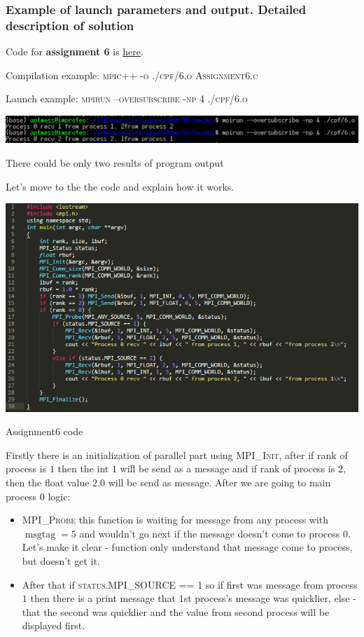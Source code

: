 \documentclass[%
12pt, %
final, %
oneside, %
onecolumn, %
centertags]{article} %
\theoremstyle{plain}
\theoremstyle{definition}
\theoremstyle{remark}
\begin{document}
\subsubsection{Example of launch parameters and output. Detailed description of solution}

Code for \textbf{assignment 6} is \href{https:\//github.com/aptmess/parallel_algorithms/blob/master/HT/hw_mpi/Assignment6.c}{here}.

Compilation example: \textsc{mpic++ -o ./cpf/6.o Assignment6.c}

Launch example: \textsc{mpirun --oversubscribe -np 4 ./cpf/6.o}

\begin{center}
\includegraphics[scale=0.7]{6.1.png}

There could be only two results of program output
\end{center}

Let's move to the the code and explain how it works.

\begin{center}
\includegraphics[scale=0.95]{6.code.png}

Assignment6 code
\end{center}

Firstly there is an initialization of parallel part using \textsc{MPI\_Init}, after if rank of process is $1$ then the int $1$ will be send as a message and if rank of process is $2$, then the float value $2.0$ will be send as message. After we are going to main process $0$ logic: 

\begin{itemize}
	\item \textsc{MPI\_Probe} this function is waiting for message from any process with $\operatorname{msgtag}=5$ and wouldn't go next if the message doesn't come to process $0$. Let's make it clear - function only understand that message come to process, but doesn't get it.
	\item After that if \textsc{status.MPI\_SOURCE == 1} so if first was message from process $1$ then there is a print message that $1$st process's message was quicklier, else - that the second was quicklier and the value from second process will be displayed first.
\end{itemize}
\end{document}
